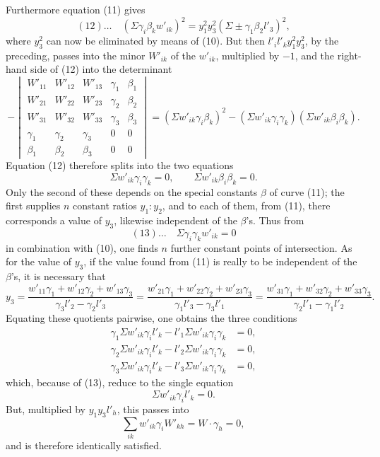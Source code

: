 \documentclass[10pt]{article}
\begin{document}
Furthermore equation (11) gives
\[
(12)\ldots\quad
(\Sigma\gamma_i\beta_kw'_{ik})^2
=y_1^2y_3^2(\Sigma\pm\gamma_1\beta_2l'_3)^2,
\]
where \(y_3^2\) can now be eliminated by means of (10). But then \(l'_il'_ky_1^2y_3^2\), by the preceding, passes into the minor \(W'_{ik}\) of the \(w'_{ik}\), multiplied by \(-1\), and the right-hand side of (12) into the determinant
\[
-\begin{vmatrix}
W'_{11}&W'_{12}&W'_{13}&\gamma_1&\beta_1\\
W'_{21}&W'_{22}&W'_{23}&\gamma_2&\beta_2\\
W'_{31}&W'_{32}&W'_{33}&\gamma_3&\beta_3\\
\gamma_1&\gamma_2&\gamma_3&0&0\\
\beta_1&\beta_2&\beta_3&0&0
\end{vmatrix}
=(\Sigma w'_{ik}\gamma_i\beta_k)^2
-(\Sigma w'_{ik}\gamma_i\gamma_k)(\Sigma w'_{ik}\beta_i\beta_k).
\]
Equation (12) therefore splits into the two equations
\[
\Sigma w'_{ik}\gamma_i\gamma_k=0,\qquad
\Sigma w'_{ik}\beta_i\beta_k=0.
\]
Only the second of these depends on the special constants \(\beta\) of curve (11); the first supplies \(n\) constant ratios \(y_1:y_2\), and to each of them, from (11), there corresponds a value of \(y_3\), likewise independent of the \(\beta\)'s. Thus from
\[
(13)\ldots\quad \Sigma\gamma_i\gamma_kw'_{ik}=0
\]
in combination with (10), one finds \(n\) further constant points of intersection. As for the value of \(y_3\), if the value found from (11) is really to be independent of the \(\beta\)'s, it is necessary that
\[
y_3=
\frac{w'_{11}\gamma_1+w'_{12}\gamma_2+w'_{13}\gamma_3}{\gamma_3l'_2-\gamma_2l'_3}
=
\frac{w'_{21}\gamma_1+w'_{22}\gamma_2+w'_{23}\gamma_3}{\gamma_1l'_3-\gamma_3l'_1}
=
\frac{w'_{31}\gamma_1+w'_{32}\gamma_2+w'_{33}\gamma_3}{\gamma_2l'_1-\gamma_1l'_2}.
\]
Equating these quotients pairwise, one obtains the three conditions
\[
\begin{aligned}
\gamma_1\Sigma w'_{ik}\gamma_il'_k-l'_1\Sigma w'_{ik}\gamma_i\gamma_k&=0,\\
\gamma_2\Sigma w'_{ik}\gamma_il'_k-l'_2\Sigma w'_{ik}\gamma_i\gamma_k&=0,\\
\gamma_3\Sigma w'_{ik}\gamma_il'_k-l'_3\Sigma w'_{ik}\gamma_i\gamma_k&=0,
\end{aligned}
\]
which, because of (13), reduce to the single equation
\[
\Sigma w'_{ik}\gamma_il'_k=0.
\]
But, multiplied by \(y_1y_3l'_h\), this passes into
\[
\sum_{ik}w'_{ik}\gamma_iW'_{kh}=W\cdot\gamma_h=0,
\]
and is therefore identically satisfied.
\end{document}
